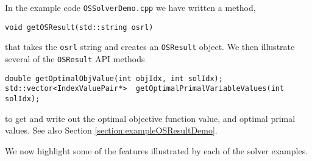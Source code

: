 \documentclass[11pt]{article}
\renewcommand{\_}{{\char"5F}}
\renewcommand{\{}{{\char"7B}}
\renewcommand{\}}{{\char"7D}}
\renewcommand{\^}{{\char"0D}}
\renewcommand{\'}{{\char"0D}}
\begin{document}
\begin{itemize}
In the example code {\tt OSSolverDemo.cpp} we have written a method,  

\begin{verbatim}
void getOSResult(std::string osrl)
\end{verbatim}

that takes the {\tt osrl} string and creates an {\tt OSResult} object.   
We then illustrate several of the {\tt OSResult} API methods 

\begin{verbatim}
double getOptimalObjValue(int objIdx, int solIdx);
std::vector<IndexValuePair*>  getOptimalPrimalVariableValues(int solIdx);
\end{verbatim}
to get and write out the optimal objective function value, and optimal primal values.  See also Section \ref{section:exampleOSResultDemo}.

\end{itemize}

We now highlight some of the features illustrated by each of the solver examples.
\end{document}
